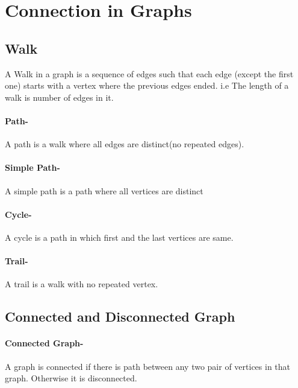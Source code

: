 \graphicspath{ {./2/} }

\section{Connection in Graphs}

\subsection{Walk}
A Walk in a graph is a sequence of edges such that each
edge (except the first one) starts with a vertex where
the previous edges ended. i.e The length of a walk is number of edges in it.

\paragraph{Path-}A path is a walk where all edges are distinct(no repeated edges).

\paragraph{Simple Path-}A simple path is a path where all vertices are distinct

\paragraph{Cycle-}A cycle is a path in which first and the last vertices are
same.

\paragraph{Trail-}A trail is a walk with no repeated vertex.


\subsection{Connected and Disconnected Graph}
\paragraph{Connected Graph-}A graph is connected if there is path between any two
pair of vertices in that graph. Otherwise it is
disconnected.

